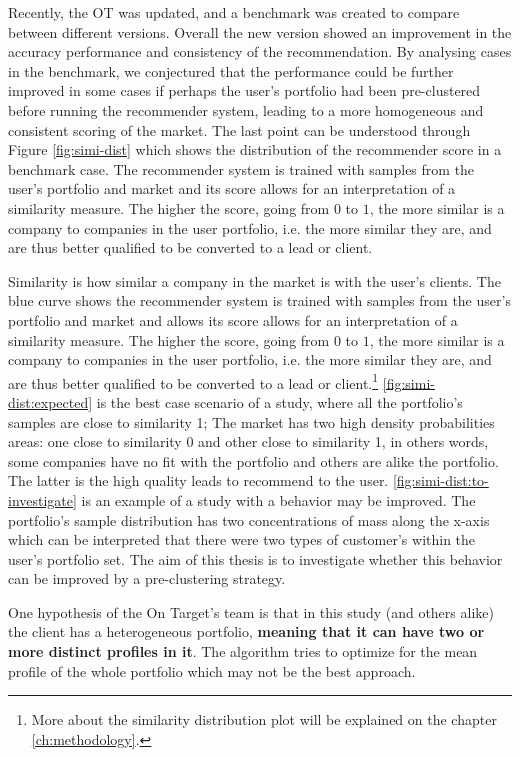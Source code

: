Recently, the OT was updated, and a benchmark was created to compare between different versions. Overall the new version showed an improvement in the accuracy performance and consistency of the recommendation. By analysing cases in the benchmark, we conjectured that the performance could be further improved in some cases if perhaps the user's portfolio had been pre-clustered before running the recommender system, leading to a more homogeneous and consistent scoring of the market. The last point can be understood through Figure \ref{fig:simi-dist} which shows the distribution of the recommender score in a benchmark case. The recommender system is trained with samples from the user's portfolio and market and its score allows for an interpretation of a similarity measure. The higher the score, going from $0$ to $1$, the more similar is a company to companies in the user portfolio, i.e. the more similar they are, and are thus better qualified to be converted to a lead or client.

Similarity is how similar a company in the market is with the user's clients. The blue curve shows the recommender system is trained with samples from the user's portfolio and market and allows its score allows for an interpretation of a similarity measure. The higher the score, going from $0$ to $1$, the more similar is a company to companies in the user portfolio, i.e. the more similar they are, and are thus better qualified to be converted to a lead or client.\footnote{More about the similarity distribution plot will be explained on the chapter \ref{ch:methodology}.}
\ref{fig:simi-dist:expected} is the best case scenario of a study, where all the portfolio's samples are close to similarity 1; The market has two high density probabilities areas: one close to similarity 0 and other close to similarity 1, in others words, some companies have no fit with the portfolio and others are alike the portfolio. The latter is the high quality leads to recommend to the user. \ref{fig:simi-dist:to-investigate} is an example of a study with a behavior may be improved. The portfolio's sample distribution has two concentrations of mass along the x-axis which can be interpreted that there were two types of customer's within the user's portfolio set. The aim of this thesis is to investigate whether this behavior can be improved by a pre-clustering strategy.

One hypothesis of the On Target's team is that in this study (and others alike) the client has a heterogeneous portfolio, \textbf{meaning that it can have two or more distinct profiles in it}. The algorithm tries to optimize for the mean profile of the whole portfolio which may not be the best approach.

